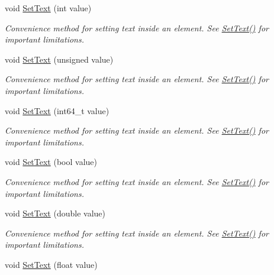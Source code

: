 \begin{DoxyCompactItemize}
void \hyperlink{classtinyxml2_1_1_x_m_l_element_aeae8917b5ea6060b3c08d4e3d8d632d7}{Set\+Text} (int value)
\begin{DoxyCompactList}\small\item\em Convenience method for setting text inside an element. See \hyperlink{classtinyxml2_1_1_x_m_l_element_a1f9c2cd61b72af5ae708d37b7ad283ce}{Set\+Text()} for important limitations. \end{DoxyCompactList}\item 
void \hyperlink{classtinyxml2_1_1_x_m_l_element_a7bbfcc11d516598bc924a8fba4d08597}{Set\+Text} (unsigned value)
\begin{DoxyCompactList}\small\item\em Convenience method for setting text inside an element. See \hyperlink{classtinyxml2_1_1_x_m_l_element_a1f9c2cd61b72af5ae708d37b7ad283ce}{Set\+Text()} for important limitations. \end{DoxyCompactList}\item 
void \hyperlink{classtinyxml2_1_1_x_m_l_element_a7b62cd33acdfeff7ea2b1b330d4368e4}{Set\+Text} (int64\+\_\+t value)
\begin{DoxyCompactList}\small\item\em Convenience method for setting text inside an element. See \hyperlink{classtinyxml2_1_1_x_m_l_element_a1f9c2cd61b72af5ae708d37b7ad283ce}{Set\+Text()} for important limitations. \end{DoxyCompactList}\item 
void \hyperlink{classtinyxml2_1_1_x_m_l_element_ae4b543d6770de76fb6ab68e541c192a4}{Set\+Text} (bool value)
\begin{DoxyCompactList}\small\item\em Convenience method for setting text inside an element. See \hyperlink{classtinyxml2_1_1_x_m_l_element_a1f9c2cd61b72af5ae708d37b7ad283ce}{Set\+Text()} for important limitations. \end{DoxyCompactList}\item 
void \hyperlink{classtinyxml2_1_1_x_m_l_element_a67bd77ac9aaeff58ff20b4275a65ba4e}{Set\+Text} (double value)
\begin{DoxyCompactList}\small\item\em Convenience method for setting text inside an element. See \hyperlink{classtinyxml2_1_1_x_m_l_element_a1f9c2cd61b72af5ae708d37b7ad283ce}{Set\+Text()} for important limitations. \end{DoxyCompactList}\item 
void \hyperlink{classtinyxml2_1_1_x_m_l_element_a51d560da5ae3ad6b75e0ab9ffb2ae42a}{Set\+Text} (float value)

\end{DoxyCompactItemize}
